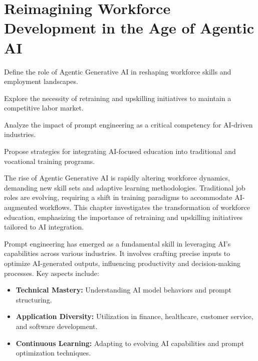 \documentclass[a4paper,headinclude=on,footinclude=on,12pt,oneside]{scrbook}
\begin{document}
\chapter{Reimagining Workforce Development in the Age of Agentic AI}

\begin{arrows}
	\item Define the role of Agentic Generative AI in reshaping workforce skills and employment landscapes.
	\item Explore the necessity of retraining and upskilling initiatives to maintain a competitive labor market.
	\item Analyze the impact of prompt engineering as a critical competency for AI-driven industries.
	\item Propose strategies for integrating AI-focused education into traditional and vocational training programs.
\end{arrows}


The rise of Agentic Generative AI is rapidly altering workforce dynamics, demanding new skill sets and adaptive learning methodologies. Traditional job roles are evolving, requiring a shift in training paradigms to accommodate AI-augmented workflows. This chapter investigates the transformation of workforce education, emphasizing the importance of retraining and upskilling initiatives tailored to AI integration.


Prompt engineering has emerged as a fundamental skill in leveraging AI’s capabilities across various industries. It involves crafting precise inputs to optimize AI-generated outputs, influencing productivity and decision-making processes. Key aspects include:
\begin{itemize}
	\item \textbf{Technical Mastery:} Understanding AI model behaviors and prompt structuring.
	\item \textbf{Application Diversity:} Utilization in finance, healthcare, customer service, and software development.
	\item \textbf{Continuous Learning:} Adapting to evolving AI capabilities and prompt optimization techniques.
\end{itemize}

\end{document}
